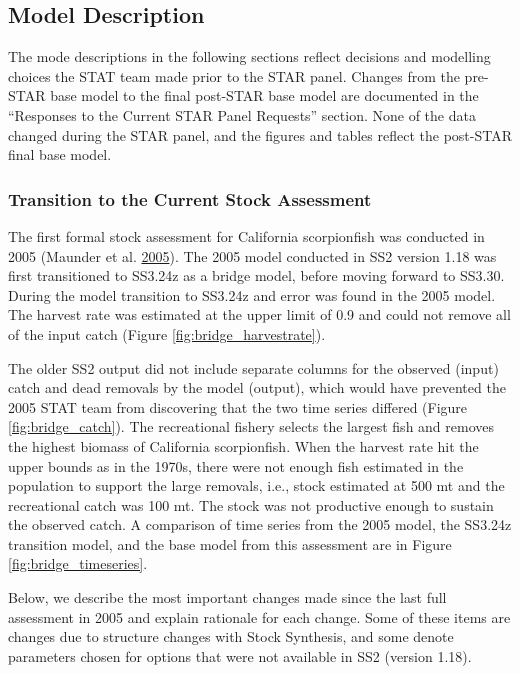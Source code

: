 \documentclass[12pt,]{article}
\begin{document}
\subsection{Model Description}\label{model-description}

The mode descriptions in the following sections reflect decisions and
modelling choices the STAT team made prior to the STAR panel. Changes
from the pre-STAR base model to the final post-STAR base model are
documented in the ``Responses to the Current STAR Panel Requests''
section. None of the data changed during the STAR panel, and the figures
and tables reflect the post-STAR final base model.

\subsubsection{Transition to the Current Stock
Assessment}\label{transition-to-the-current-stock-assessment}

The first formal stock assessment for California scorpionfish was
conducted in 2005 (Maunder et al.
\protect\hyperlink{ref-Maunder2005}{2005}). The 2005 model conducted in
SS2 version 1.18 was first transitioned to SS3.24z as a bridge model,
before moving forward to SS3.30. During the model transition to SS3.24z
and error was found in the 2005 model. The harvest rate was estimated at
the upper limit of 0.9 and could not remove all of the input catch
(Figure \ref{fig:bridge_harvestrate}).

The older SS2 output did not include separate columns for the observed
(input) catch and dead removals by the model (output), which would have
prevented the 2005 STAT team from discovering that the two time series
differed (Figure \ref{fig:bridge_catch}). The recreational fishery
selects the largest fish and removes the highest biomass of California
scorpionfish. When the harvest rate hit the upper bounds as in the
1970s, there were not enough fish estimated in the population to support
the large removals, i.e., stock estimated at 500 mt and the recreational
catch was 100 mt. The stock was not productive enough to sustain the
observed catch. A comparison of time series from the 2005 model, the
SS3.24z transition model, and the base model from this assessment are in
Figure \ref{fig:bridge_timeseries}.

Below, we describe the most important changes made since the last full
assessment in 2005 and explain rationale for each change. Some of these
items are changes due to structure changes with Stock Synthesis, and
some denote parameters chosen for options that were not available in SS2
(version 1.18).
\end{document}
